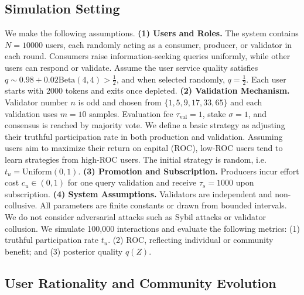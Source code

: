 \subsection{Simulation Setting}
We make the following assumptions. 
\textbf{(1) Users and Roles.}
The system contains $N=10000$ users, each randomly acting as a consumer, producer, or validator in each round.
Consumers raise information-seeking queries uniformly, while other users can respond or validate.
Assume the user service quality satisfies $q \sim 0.98 + 0.02\mathrm{Beta}(4,4) > \frac{1}{2}$, and when selected randomly, $q = \frac{1}{2}$. Each user starts with 2000 tokens and exits once depleted.
\textbf{(2) Validation Mechanism.}
Validator number $n$ is odd and chosen from $\{1,5,9,17,33,65\}$ and each validation uses $m=10$ samples.
Evaluation fee $\tau_{\text{val}}=1$, stake $\sigma=1$, and consensus is reached by majority vote. We define a basic strategy as adjusting their truthful participation rate in both production and validation.
Assuming users aim to maximize their return on capital (ROC), low-ROC users tend to learn strategies from high-ROC users. The initial strategy is random, i.e. $t_u =\text{Uniform}(0,1)$.
\textbf{(3) Promotion and Subscription.}
Producers incur effort cost $c_u\in(0,1)$ for one query validation and receive $\tau_s=1000$ upon subscription. 
\textbf{(4) System Assumptions.}
Validators are independent and non-collusive. All parameters are finite constants or drawn from bounded intervals. We do not consider adversarial attacks such as Sybil attacks or validator collusion.
We simulate 100,000 interactions and evaluate the following metrics:
(1) truthful participation rate $t_u$.
(2) ROC, reflecting individual or community benefit; and
(3) posterior quality $q(Z)$.

\subsection{User Rationality and Community Evolution}

